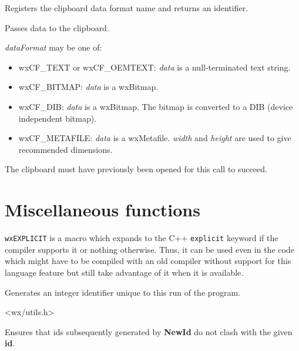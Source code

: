Registers the clipboard data format name and returns an identifier.

\label{wxsetclipboarddata}


Passes data to the clipboard.

{\it dataFormat} may be one of:

\begin{itemize}\itemsep=0pt
\item wxCF\_TEXT or wxCF\_OEMTEXT: {\it data} is a null-terminated text string.
\item wxCF\_BITMAP: {\it data} is a wxBitmap.
\item wxCF\_DIB: {\it data} is a wxBitmap. The bitmap is converted to a DIB (device independent bitmap).
\item wxCF\_METAFILE: {\it data} is a wxMetafile. {\it width} and {\it height} are used to give recommended dimensions.
\end{itemize}

The clipboard must have previously been opened for this call to succeed.

\section{Miscellaneous functions}\label{miscellany}

\label{wxexplicit}

{\tt wxEXPLICIT} is a macro which expands to the C++ {\tt explicit} keyword if
the compiler supports it or nothing otherwise. Thus, it can be used even in the
code which might have to be compiled with an old compiler without support for
this language feature but still take advantage of it when it is available.

\label{wxnewid}


Generates an integer identifier unique to this run of the program.


<wx/utils.h>

\label{wxregisterid}


Ensures that ids subsequently generated by {\bf NewId} do not clash with
the given {\bf id}.

